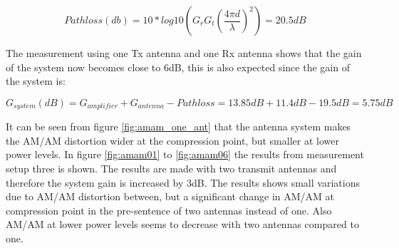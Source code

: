 \begin{equation}\label{eq:friss_1m}
Pathloss(db) = 10*log10(G_r G_t (\frac{4\pi d}{\lambda})^2)=20.5dB
\end{equation}

The measurement using one Tx antenna and one Rx antenna shows that the gain of the system now becomes close to 6dB, this is also expected since the gain of the system is: 

\begin{equation}
G_{system}(dB) = G_{amplifier}+G_{antenna}-Pathloss = 13.85dB + 11.4dB -19.5dB = 5.75dB
\end{equation}

It can be seen from figure \ref{fig:amam_one_ant} that the antenna system makes the AM/AM distortion wider at the compression point, but smaller at lower power levels. In figure \ref{fig:amam01} to \ref{fig:amam06} the results from measurement setup three is shown. The results are made with two transmit antennas and therefore the system gain is increased by 3dB. The results shows small variations due to AM/AM distortion between, but a significant change in AM/AM at compression point in the pre-sentence of two antennas instead of one. Also AM/AM at lower power levels seems to decrease with two antennas compared to one. 

